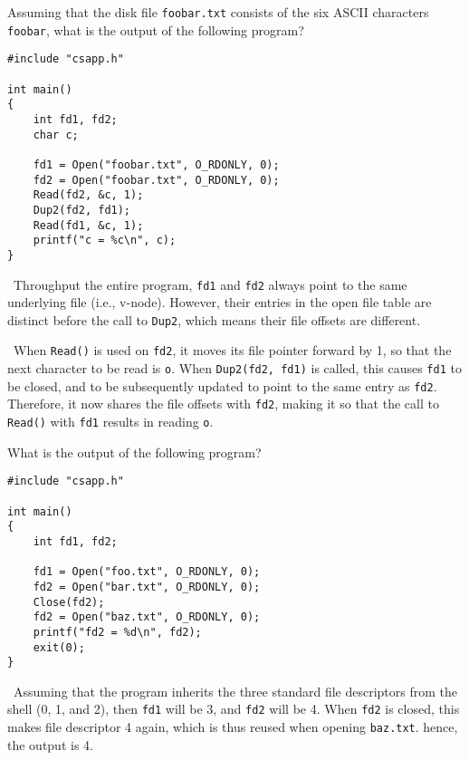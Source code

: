 \documentclass[12pt]{article}
\newenvironment{ex}[2][Exercise]{\begin{trivlist}
		\item[\hskip \labelsep {\bfseries #1}\hskip \labelsep {\bfseries #2.}]}{\end{trivlist}}
\newenvironment{sol}[1][Solution]{\begin{trivlist}
		\item[\hskip \labelsep {\bfseries #1:}]}{\end{trivlist}}
\begin{document}
\begin{ex}{10.5}
	Assuming that the disk file \texttt{foobar.txt} consists of the six ASCII characters \texttt{foobar},
	what is the output of the following program?
	\begin{lstlisting}
#include "csapp.h"

int main()
{
	int fd1, fd2;
	char c;
	
	fd1 = Open("foobar.txt", O_RDONLY, 0);
	fd2 = Open("foobar.txt", O_RDONLY, 0);
	Read(fd2, &c, 1);
	Dup2(fd2, fd1);
	Read(fd1, &c, 1);
	printf("c = %c\n", c);
}
	\end{lstlisting}
\end{ex}

\begin{sol}
	\
	Throughput the entire program, \texttt{fd1} and \texttt{fd2} always point to the same underlying
	file (i.e., v-node). However, their entries in the open file table are distinct before the
	call to \texttt{Dup2}, which means their file offsets are different.
	
	\
	When \texttt{Read()} is used on \texttt{fd2}, it moves its file pointer forward by 1, so
	that the next character to be read is \texttt{o}. When \texttt{Dup2(fd2, fd1)} is called,
	this causes \texttt{fd1} to be closed, and to be subsequently updated to point to the
	same entry as \texttt{fd2}. Therefore, it now shares the file offsets with \texttt{fd2},
	making it so that the call to \texttt{Read()} with \texttt{fd1} results in reading \texttt{o}.
\end{sol}

\begin{ex}{10.6}
	What is the output of the following program?
	\begin{lstlisting}
#include "csapp.h"

int main()
{
	int fd1, fd2;
	
	fd1 = Open("foo.txt", O_RDONLY, 0);
	fd2 = Open("bar.txt", O_RDONLY, 0);
	Close(fd2);
	fd2 = Open("baz.txt", O_RDONLY, 0);
	printf("fd2 = %d\n", fd2);
	exit(0);
}
	\end{lstlisting}
\end{ex}

\begin{sol}
	\
	Assuming that the program inherits the three standard file descriptors from the shell
	(0, 1, and 2), then \texttt{fd1} will be 3, and \texttt{fd2} will be 4. When \texttt{fd2} is
	closed, this makes file descriptor 4 again, which is thus reused when opening \texttt{baz.txt}.
	hence, the output is 4.
\end{sol}
\end{document}
